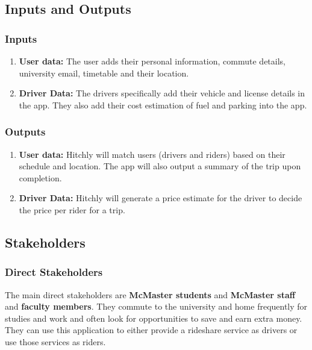 \documentclass{article}
\begin{document}
\subsection{Inputs and Outputs}

\subsubsection{Inputs}
\begin{enumerate}
\item \textbf{User data:} The user adds their personal information, commute details, university email, timetable and their location.
\item \textbf{Driver Data:} The drivers specifically add their vehicle and license details in the app. They also add their cost estimation of fuel and parking into the app.
\end{enumerate}

\subsubsection{Outputs}
\begin{enumerate}
\item \textbf{User data:} Hitchly will match users (drivers and riders) based on their schedule and location. The app will also output a summary of the trip upon completion.
\item \textbf{Driver Data:} Hitchly will generate a price estimate for the driver to decide the price per rider for a trip.  
\end{enumerate}

\subsection{Stakeholders}

\subsubsection{Direct Stakeholders}
The main direct stakeholders are \textbf{McMaster students} and \textbf{McMaster staff} and \textbf{faculty members}. They commute to the university and home frequently for studies and work and often look for opportunities to save and earn extra money. They can use this application to either provide a rideshare service as drivers or use those services as riders.  
\end{document}
